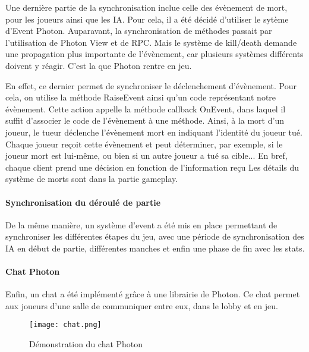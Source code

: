             Une dernière partie de la synchronisation inclue celle des évènement de mort, pour les joueurs ainsi
            que les IA. Pour cela, il a été décidé d'utiliser le sytème d'Event Photon. Auparavant, la synchronisation de méthodes
            passait par l'utilisation de Photon View et de RPC. Mais le système de kill/death demande une propagation plus importante
            de l'évènement, car plusieurs systèmes différents doivent y réagir. C'est la que Photon rentre en jeu.

            En effet, ce dernier permet de synchroniser le déclenchement d'évènement. Pour cela, on utilise la méthode RaiseEvent ainsi
            qu'un code représentant notre évènement. Cette action appelle la méthode callback OnEvent, dans laquel il suffit d'associer le
            code de l'évènement à une méthode. Ainsi, à la mort d'un joueur, le tueur déclenche l'évènement mort en indiquant l'identité du
            joueur tué. Chaque joueur reçoit cette évènement et peut déterminer, par exemple, si le joueur mort est lui-même, ou bien si un
            autre joueur a tué sa cible... En bref, chaque client prend une décision en fonction de l'information reçu
            Les détails du système de morts sont dans la partie gameplay.


        \paragraph{Synchronisation du déroulé de partie}

            De la même manière, un système d'event a été mis en place permettant de synchroniser les différentes étapes du jeu, 
            avec une période de synchronisation des IA en début de partie, différentes manches et enfin une phase de fin avec les stats.


        \paragraph{Chat Photon}

        Enfin, un chat a été implémenté grâce à une librairie de Photon. Ce chat permet aux joueurs 
        d'une salle de communiquer entre eux, dans le lobby et en jeu.

        \begin{figure}[hbt!]
            \centering
            \texttt{[image: chat.png]}
            \caption{Démonstration du chat Photon}
        \end{figure}



